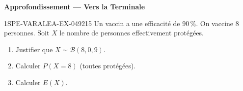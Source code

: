 \begin{center}\textbf{Approfondissement — Vers la Terminale}\end{center}
\begin{exercice}{1SPE-VARALEA-EX-049}{2}{15}
Un vaccin a une efficacité de $90\,\%$. On vaccine $8$ personnes. Soit $X$ le nombre de personnes effectivement protégées.

\begin{enumerate}
  \item Justifier que $X \sim \mathcal{B}(8, 0{,}9)$.
  \item Calculer $P(X = 8)$ (toutes protégées).
  \item Calculer $E(X)$.
\end{enumerate}
\end{exercice}
